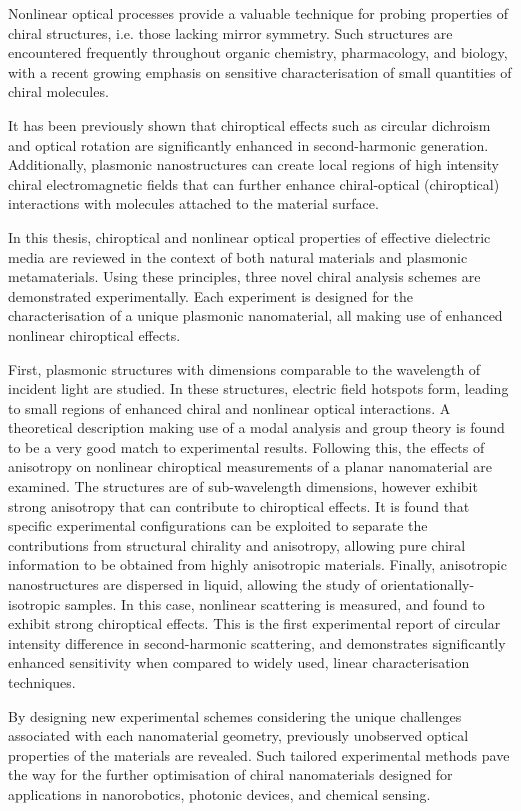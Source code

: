 Nonlinear optical processes provide a valuable technique for probing properties of chiral structures, i.e. those lacking mirror symmetry. 
Such structures are encountered frequently throughout organic chemistry, pharmacology, and biology, with a recent growing emphasis on sensitive characterisation of small quantities of chiral molecules. 
	    
It has been previously shown that chiroptical effects such as circular dichroism and optical rotation are significantly enhanced in second-harmonic generation. 
Additionally, plasmonic nanostructures can create local regions of high intensity chiral electromagnetic fields that can further enhance chiral-optical (chiroptical) interactions with molecules attached to the material surface. 
	    
In this thesis, chiroptical and nonlinear optical properties of effective dielectric media are reviewed in the context of both natural materials and plasmonic metamaterials. 
Using these principles, three novel chiral analysis schemes are demonstrated experimentally. Each experiment is designed for the characterisation of a unique plasmonic nanomaterial, all making use of enhanced nonlinear chiroptical effects. 

First, plasmonic structures with dimensions comparable to the wavelength of incident light are studied. In these structures, electric field hotspots form, leading to small regions of enhanced chiral and nonlinear optical interactions. A theoretical description making use of a modal analysis and group theory is found to be a very good match to experimental results. Following this, the effects of anisotropy on nonlinear chiroptical measurements of a planar nanomaterial are examined. The structures are of sub-wavelength dimensions, however exhibit strong anisotropy that can contribute to chiroptical effects. It is found that specific experimental configurations can be exploited to separate the contributions from structural chirality and anisotropy, allowing pure chiral information to be obtained from highly anisotropic materials. Finally, anisotropic nanostructures are dispersed in liquid, allowing the study of orientationally-isotropic samples. In this case, nonlinear scattering is measured, and found to exhibit strong chiroptical effects. This is the first experimental report of circular intensity difference in second-harmonic scattering, and demonstrates significantly enhanced sensitivity when compared to widely used, linear characterisation techniques.

By designing new experimental schemes considering the unique challenges associated with each nanomaterial geometry, previously unobserved optical properties of the materials are revealed. Such tailored experimental methods pave the way for the further optimisation of chiral nanomaterials designed for applications in nanorobotics, photonic devices, and chemical sensing.